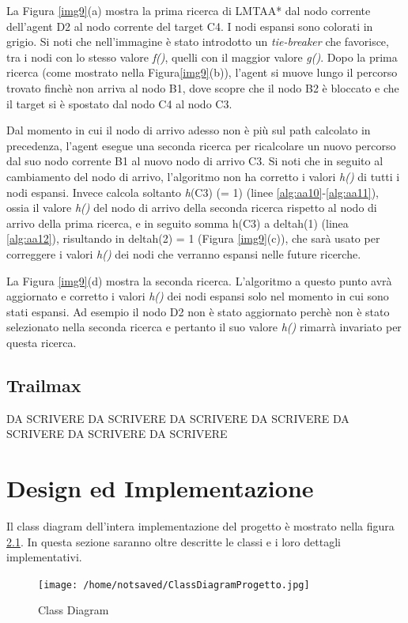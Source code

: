 \documentclass[11pt]{book}
\begin{document}
\par{La Figura \ref{img9}(a) mostra la prima ricerca di LMTAA* dal nodo corrente dell'agent D2 al nodo corrente del target C4. I nodi espansi sono colorati in grigio. Si noti che nell'immagine \`e stato introdotto un \emph{tie-breaker} che favorisce, tra i nodi con lo stesso valore \emph{f()}, quelli con il maggior valore \emph{g()}. Dopo la prima ricerca (come mostrato nella Figura\ref{img9}(b)), l'agent si muove lungo il percorso trovato finch\`e non arriva al nodo B1, dove scopre che il nodo B2 \`e bloccato e che il target si \`e spostato dal nodo C4 al nodo C3.}
\par{Dal momento in cui il nodo di arrivo adesso non \`e pi\`u sul path calcolato in precedenza, l'agent esegue una seconda ricerca per ricalcolare un nuovo percorso dal suo nodo corrente B1 al nuovo nodo di arrivo C3. Si noti che in seguito al cambiamento del nodo di arrivo, l'algoritmo non ha corretto i valori \emph{h()} di tutti i nodi espansi. Invece calcola soltanto \emph{h}(C3) (= 1) (linee \ref{alg:aa10}-\ref{alg:aa11}), ossia il valore \emph{h()} del nodo di arrivo della seconda ricerca rispetto al nodo di arrivo della prima ricerca, e in seguito somma h(C3) a deltah(1) (linea \ref{alg:aa12}), risultando in deltah(2) = 1 (Figura \ref{img9}(c)), che sar\`a usato per correggere i valori \emph{h()} dei nodi che verranno espansi nelle future ricerche.}
\par{La Figura \ref{img9}(d) mostra la seconda ricerca. L'algoritmo a questo punto avr\`a aggiornato e corretto i valori \emph{h()} dei nodi espansi solo nel momento in cui sono stati espansi. Ad esempio il nodo D2 non \`e stato aggiornato perch\`e non \`e stato selezionato nella seconda ricerca e pertanto il suo valore \emph{h()} rimarr\`a invariato per questa ricerca. }

\section{Trailmax}
\label{sec:trailmax}

DA SCRIVERE DA SCRIVERE DA SCRIVERE DA SCRIVERE DA SCRIVERE DA SCRIVERE DA SCRIVERE 

\chapter{Design ed Implementazione}
Il class diagram dell'intera implementazione del progetto \`e mostrato nella figura \ref{classdiagram}. In questa sezione saranno oltre descritte le classi e i loro dettagli implementativi.
\begin{figure}[htp]
\centering
\texttt{[image: /home/notsaved/ClassDiagramProgetto.jpg]}
\caption{Class Diagram}
\label{classdiagram}
\end{figure}
\end{document}
